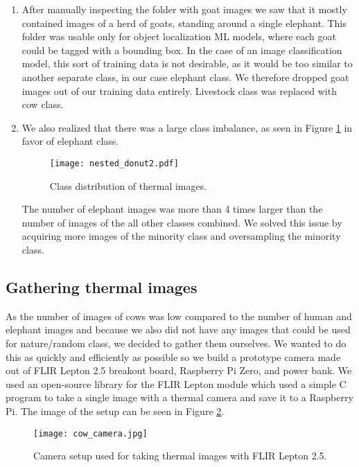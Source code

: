 \begin{enumerate}
    \item After manually inspecting the folder with goat images we saw that it mostly contained images of a herd of goats, standing around a single elephant.
This folder was usable only for object localization ML models, where each goat could be tagged with a bounding box. 
In the case of an image classification model, this sort of training data is not desirable, as it would be too similar to another separate class, in our case elephant class.
We therefore dropped goat images out of our training data entirely.
Livestock class was replaced with cow class.

    \item We also realized that there was a large class imbalance, as seen in Figure \ref{nested_donut2} in favor of elephant class.

\begin{figure}[ht]
    \centering
    \texttt{[image: nested\_donut2.pdf]} 
    \caption{Class distribution of thermal images.}
    \label{nested_donut2}
\end{figure}

The number of elephant images was more than 4 times larger than the number of images of the all other classes combined.
We solved this issue by acquiring more images of the minority class and oversampling the minority class.
\end{enumerate}

\subsection{ Gathering thermal images}

As the number of images of cows was low compared to the number of human and elephant images and because we also did not have any images that could be used for nature/random class, we decided to gather them ourselves.
We wanted to do this as quickly and efficiently as possible so we build a prototype camera made out of FLIR Lepton 2.5 breakout board, Raspberry Pi Zero, and power bank.
We used an open-source library \cite{flir_github} for the FLIR Lepton module which used a simple C program to take a single image with a thermal camera and save it to a Raspberry Pi.
The image of the setup can be seen in Figure \ref{cow_camera}.

\begin{figure}[ht]
    \centering
    \texttt{[image: cow\_camera.jpg]} 
    \caption{Camera setup used for taking thermal images with FLIR Lepton 2.5.}
    \label{cow_camera}
\end{figure}

